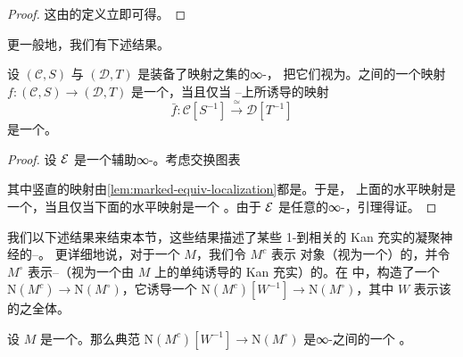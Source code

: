 \begin{proof}
这由\trLocalization{}的定义立即可得。
\end{proof}

更一般地，我们有下述结果。

\begin{lemma}\label{lem:marked-equiv-dk-equivalence}
设 $(\mathcal{C}, S)$ 与 $(\mathcal{D}, T)$ 是装备了映射之集的∞-\trCategories{}，
把它们视为\trMarkedSimplicialSet{}。\trMarkedSimplicialSet{}之间的一个映射
$f\colon (\mathcal{C}, S) \to (\mathcal{D}, T)$ 是一个\trMarkedEquivalence{}，当且仅当%
\trDwyer{}--\trKan{}\trLocalization{}上所诱导的映射
\[
\bar{f}\colon \mathcal{C}[S^{-1}] \xrightarrow{\ \simeq\ } \mathcal{D}[T^{-1}]
\]
是一个\trEquivalence{}。
\end{lemma}

\begin{proof}
设 $\mathcal{E}$ 是一个辅助∞-\trCategory{}。考虑交换图表
\begin{center}
\end{center}
其中竖直的映射由\cref{lem:marked-equiv-localization}都是\trEquivalence{}。于是，
上面的水平映射是一个\trEquivalence{}，当且仅当下面的水平映射是一个%
\trEquivalence{}。由于 $\mathcal{E}$ 是任意的∞-\trCategory{}，引理得证。
\end{proof}

我们以下述结果来结束本节，这些结果描述了某些 1-\trCategories{}到相关的
Kan 充实\trCategories{}的凝聚神经的\trDwyer{}--\trKan{}\trLocalization{}。
更详细地说，对于一个\trSimplicialModelCategory{} $M$，我们令 $M^c$ 表示%
\trCofibrant{}对象（视为一个\trOrdinaryCategory{}）的\trCategory{}，并令 $M^\circ$
表示\trCofibrant{}--\trFibrantObject{}（视为一个由 $M$ 上的单纯\trModelStructure{}诱导的
Kan 充实\trCategory{}）的\trCategory{}。在 \cite{Lur17} 中，\trLurie{}构造了一个\trFunctor{}%
$\mathrm{N}(M^c) \to \mathrm{N}(M^\circ)$，它诱导一个\trFunctor{}%
$\mathrm{N}(M^c)[W^{-1}] \to \mathrm{N}(M^\circ)$，其中 $W$ 表示该%
\trModelStructure{}的\trWeakEquivalence{}之全体。

\begin{theorem}\label{thm:dk-simplicial-model}
设 $M$ 是一个\trSimplicialModelCategory{}。那么典范\trFunctor{}%
$\mathrm{N}(M^c)[W^{-1}] \to \mathrm{N}(M^\circ)$ 是∞-\trCategories{}之间的一个%
\trEquivalence{}。
\end{theorem}


